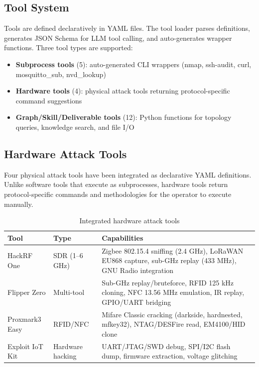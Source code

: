 \documentclass[11pt,a4paper]{article}
\begin{document}
\subsection{Tool System}

Tools are defined declaratively in YAML files. The tool loader parses definitions, generates JSON Schema for LLM tool calling, and auto-generates wrapper functions. Three tool types are supported:

\begin{itemize}
    \item \textbf{Subprocess tools} (5): auto-generated CLI wrappers (nmap, ssh-audit, curl, mosquitto\_sub, nvd\_lookup)
    \item \textbf{Hardware tools} (4): physical attack tools returning protocol-specific command suggestions
    \item \textbf{Graph/Skill/Deliverable tools} (12): Python functions for topology queries, knowledge search, and file I/O
\end{itemize}

\subsection{Hardware Attack Tools}

Four physical attack tools have been integrated as declarative YAML definitions. Unlike software tools that execute as subprocesses, hardware tools return protocol-specific commands and methodologies for the operator to execute manually.

\begin{table}[H]
\centering
\begin{tabular}{@{}llp{7cm}@{}}
\toprule
\textbf{Tool} & \textbf{Type} & \textbf{Capabilities} \\
\midrule
HackRF One & SDR (1--6 GHz) & Zigbee 802.15.4 sniffing (2.4 GHz), LoRaWAN EU868 capture, sub-GHz replay (433 MHz), GNU Radio integration \\
Flipper Zero & Multi-tool & Sub-GHz replay/bruteforce, RFID 125 kHz cloning, NFC 13.56 MHz emulation, IR replay, GPIO/UART bridging \\
Proxmark3 Easy & RFID/NFC & Mifare Classic cracking (darkside, hardnested, mfkey32), NTAG/DESFire read, EM4100/HID clone \\
Exploit IoT Kit & Hardware hacking & UART/JTAG/SWD debug, SPI/I2C flash dump, firmware extraction, voltage glitching \\
\bottomrule
\end{tabular}
\caption{Integrated hardware attack tools}
\label{tab:hardware}
\end{table}
\end{document}
